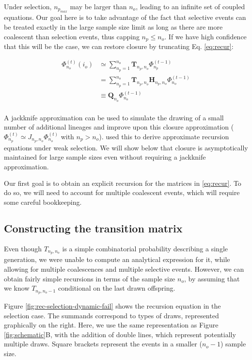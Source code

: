 \documentclass[review]{elsarticle}
\newcommand{\afs}[2]{\Phi_{#1}^{(#2)}}
\begin{document}
Under selection, $n_{p_{max}}$ may be larger than $n_o$, leading to an infinite set of coupled
equations. Our goal here is to take advantage of the fact that selective events can be treated
exactly in the large sample size limit as long as there are more coalescent than selection events,
thus capping $n_p \leq n_o$. If we have high confidence that this will be the case, we can restore
closure by truncating Eq. \eqref{eq:recur}:

\begin{equation}
\begin{split}
  \afs{n_o}{t}(i_o)
  &\simeq \sum_{n_p=1}^{n_{o}} \mathbf{T}_{n_p,n_o}                      \afs{n_p}{t-1}\\
  &=      \sum_{n_p=1}^{n_{o}} \mathbf{T}_{n_p,n_o} \mathbf{H}_{n_p,n_o} \afs{n_o}{t-1}\\
  &\equiv \mathbf{Q}_{n_o}                                               \afs{n_o}{t-1}\\
\end{split}
\label{eq:truncated}
\end{equation}

A jackknife approximation can be used to simulate the drawing of a small number of additional
lineages and improve upon this closure approximation ($\afs{n_p}{t} \simeq J_{n_p,n_o} \afs{n_o}{t}$
with $n_p>n_o$). \cite{JouganousEtAl2017} used this to derive approximate recursion equations under
weak selection. We will show below that closure is asymptotically maintained for large sample sizes
even without requiring a jackknife approximation.

Our first goal is to obtain an explicit recursion for the matrices in \eqref{eq:recur}. To do so, we
will need to account for multiple coalescent events, which will require some careful bookkeeping.

\subsection{Constructing the transition matrix}
\label{subsec:trans-mat}

Even though $T_{n_p,n_o}$ is a simple combinatorial probability describing a single generation, we
were unable to compute an analytical expression for it, while allowing for multiple coalescences and
multiple selective events. However, we can obtain fairly simple recursions in terms of the sample
size $n_o$, by assuming that we know $T_{n_p,n_o-1}$ conditional on the last drawn offspring.

Figure \ref{fig:rec-selection-dynamic-fail} shows the recursion equation in the selection case. The
summands correspond to types of draws, represented graphically on the right. Here, we use the same
representation as Figure \ref{fig:schematic}B, with the addition of double lines, which represent
potentially multiple draws. Square brackets represent the events in a smaller ($n_o-1$) sample size.
\end{document}
